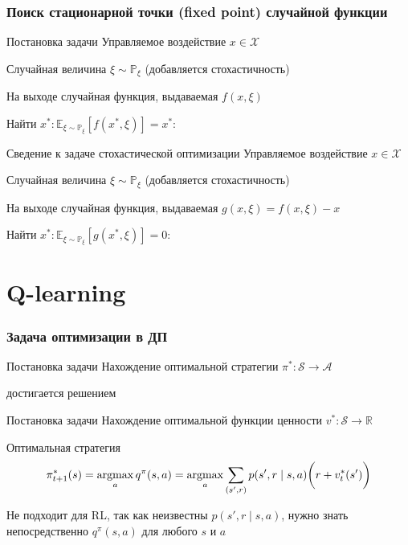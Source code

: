 \documentclass[notheorems]{beamer} %
\DeclareMathOperator*{\argmax}{argmax}
\begin{document}
\begin{frame}
	\frametitle{Поиск стационарной точки (fixed point) случайной функции}
	\begin{block}{Постановка задачи}
		Управляемое воздействие  $x \in \mathcal{X}$
		
		Случайная величина $\xi \sim \mathbb{P}_\xi$ (добавляется стохастичность)
		
		На выходе случайная функция, выдаваемая  $f(x, \xi)$
		
		Найти $x^* : \mathbb{E}_{\xi \sim \mathbb{P}_\xi}[ f(x^*, \xi) ] = x^*$:
	\end{block}
	
	\begin{block}{Сведение к задаче стохастической оптимизации}
		Управляемое воздействие  $x \in \mathcal{X}$

		Случайная величина $\xi \sim \mathbb{P}_\xi$ (добавляется стохастичность)
		
		На выходе случайная функция, выдаваемая  \alert{$g(x, \xi) = f(x, \xi)- x$}
		
		Найти $x^* : \mathbb{E}_{\xi \sim \mathbb{P}_\xi}[ g(x^*, \xi) ] = 0$:

	\end{block}
\end{frame}





\section{Q-learning}
\begin{frame}
	
	\frametitle{Задача оптимизации в ДП}
	\begin{block}{Постановка задачи}
		Нахождение оптимальной стратегии $\pi^* : \mathcal{S} \to \mathcal{A} $
	\end{block}
	достигается решением 
	\begin{block}{Постановка задачи}
		Нахождение оптимальной функции ценности $v^* : \mathcal{S} \to \mathbb{R} $
	\end{block}

\begin{block}{Оптимальная стратегия}
	$$ \pi_{t+1}^* (s) = \argmax_a q^\pi(s,a) = \argmax_a \sum_{(s',r)}p(s',r \mid s,a)\bigg{(}r + v_t^*(s')\bigg{)} $$
\end{block}

Не подходит для RL, так как неизвестны  $p(s',r \mid s,a)$, нужно знать непосредственно $q^\pi(s,a)$ для любого $s$ и $a$
\end{frame}
\end{document}
